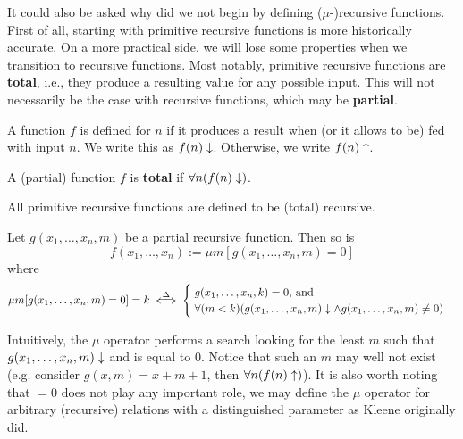\documentclass[../main.tex]{memoir}
\begin{document}
It could also be asked why did we not begin by defining ($\mu$-)recursive functions. First of all, starting with primitive recursive functions is more historically accurate. On a more practical side, we will lose some properties when we transition to recursive functions. Most notably, primitive recursive functions are \textbf{total}, i.e., they produce a resulting value for any possible input. This will not necessarily be the case with recursive functions, which may be \textbf{partial}.

\begin{definition}
  A function $f$ is defined for $n$ if it produces a result when (or it allows to be) fed with input $n$. We write this as $f(n) \downarrow$. Otherwise, we write $f(n) \uparrow$.
\end{definition}

\begin{definition}
  A (partial) function $f$ is \textbf{total} if $\forall n (f(n) \downarrow)$.
\end{definition}

\begin{definition}
  All primitive recursive functions are defined to be (total) recursive.
\end{definition}

\begin{definition}[$\mu$-operator]
  Let $g(x_1, \ldots, x_n, m)$ be a partial recursive function. Then so is
  \[ f(x_1, \ldots, x_n) := \mu m [g(x_1, \ldots, x_n, m) = 0] \]
  where
  \begin{equation*}
    \mu m [g(x_1, \ldots, x_n, m) = 0] = k \overset{\Delta}{\iff}
    \begin{cases}
      \; g(x_1, \ldots, x_n, k) = 0 \text{, and} \\
      \; \forall (m < k) (g(x_1, \ldots, x_n, m) \downarrow \land g(x_1, \ldots, x_n, m) \neq 0)
    \end{cases}
  \end{equation*}
\end{definition}

\begin{remark}
  Intuitively, the $\mu$ operator performs a search looking for the least $m$ such that $g(x_1, \ldots, x_n, m) \downarrow$ and is equal to $0$. Notice that such an $m$ may well not exist (e.g. consider $g(x, m) = x + m + 1$, then $\forall n (f(n) \uparrow)$). It is also worth noting that $= 0$ does not play any important role, we may define the $\mu$ operator for arbitrary (recursive) relations with a distinguished parameter as Kleene originally did. \cite{kleene}
\end{remark}
\end{document}
